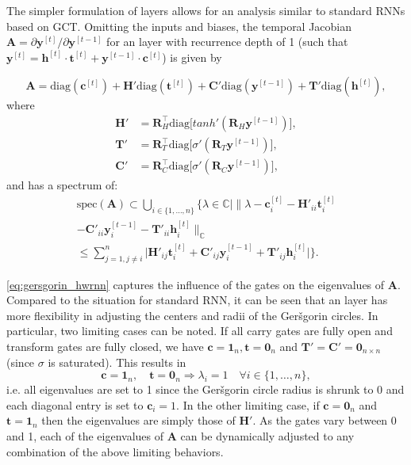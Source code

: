 \documentclass[letterpaper]{article}
\newcommand{\ts}[1]{^{[#1]}}
\def\gers{Ger\v{s}gorin}
\def\Amat{\mathbf{A}}
\def\Rmat{\mathbf{R}}
\def\yvec{\mathbf{y}}
\def\Hvec{\mathbf{h}}
\def\Tvec{\mathbf{t}}
\def\Cvec{\mathbf{c}}
\def\srnn{standard RNN}
\begin{document}
The simpler formulation of \arch{} layers allows for an analysis similar to \srnn{s} based on GCT.
Omitting the inputs and biases, the temporal Jacobian $\Amat = \partial \yvec\ts{t} / \partial \yvec\ts{t-1}$ for an \arch{} layer with recurrence depth of 1 (such that $\yvec\ts{t} = \Hvec\ts{t} \cdot \Tvec\ts{t} + \yvec\ts{t-1} \cdot \Cvec\ts{t}$) is given by

\begin{equation}
\Amat = \mathrm{diag}(\Cvec\ts{t}) + \mathbf{H'}\mathrm{diag}(\Tvec\ts{t})  + \mathbf{C'}\mathrm{diag}(\yvec\ts{t-1}) + \mathbf{T'} \mathrm{diag}(\Hvec\ts{t}),
\end{equation}
where
\begin{align}
 \mathbf{H'} &= \Rmat_H^\top \mathrm{diag}\big[tanh'(\Rmat_H\yvec\ts{t-1})\big], \\
 \mathbf{T'} &= \Rmat_T^\top \mathrm{diag}\big[\sigma'(\Rmat_T\yvec\ts{t-1})\big],
\\
 \mathbf{C'} &= \Rmat_C^\top \mathrm{diag}\big[\sigma'(\Rmat_C\yvec\ts{t-1})\big], \end{align}
and has a spectrum of:
\begin{multline}\label{eq:gersgorin_hwrnn}
\mathrm{spec}(\Amat) \subset \bigcup_{i\in \{1,\dots, n\}} \bigg\{ \lambda \in \mathbb{C} \big| \big\lVert\lambda-\Cvec_{i}\ts{t} -\mathbf{H'}_{ii}\Tvec_{i}\ts{t}\\
-\mathbf{C'}_{ii}\yvec\ts{t-1}_i - \mathbf{T'}_{ii} \Hvec_i\ts{t}\big\rVert_\mathbb{C} \\ \leq \sum_{j=1, j \neq i}^n \big|\mathbf{H'}_{ij}\Tvec_{i}\ts{t}+\mathbf{C'}_{ij}\yvec\ts{t-1}_i+\mathbf{T'}_{ij}\Hvec_i\ts{t}\big| \bigg\}.
\end{multline} 

\autoref{eq:gersgorin_hwrnn} captures the influence of the gates on the eigenvalues of $\Amat$. 
Compared to the situation for \srnn{}, it can be seen that an \arch{} layer has more flexibility in adjusting the centers and radii of the \gers{} circles. 
In particular, two limiting cases can be noted. If all carry gates are fully open and transform gates are fully closed, we have $\Cvec=\mathbf{1}_{n}, \Tvec=\mathbf{0}_{n}$ and $\mathbf{T'} =\mathbf{C'}=\mathbf{0}_{n \times n}$ (since $\sigma$ is saturated).
This results in
\begin{equation}
\Cvec=\mathbf{1}_n, \quad \Tvec=\mathbf{0}_{n} \Rightarrow \lambda_i = 1 \quad \forall i \in \{1, \dots ,n \},
\end{equation}
i.e. all eigenvalues are set to 1 since the \gers{} circle radius is shrunk to 0 and each diagonal entry is set to $\Cvec_{i}=1$.  In the other limiting case, if $\Cvec=\mathbf{0}_{n}$ and $\Tvec=\mathbf{1}_n$ then the eigenvalues are simply those of $\mathbf{H}'$.
As the gates vary between 0 and 1, each of the eigenvalues of $\Amat$ can be dynamically adjusted to any combination of the above limiting behaviors.
\end{document}
